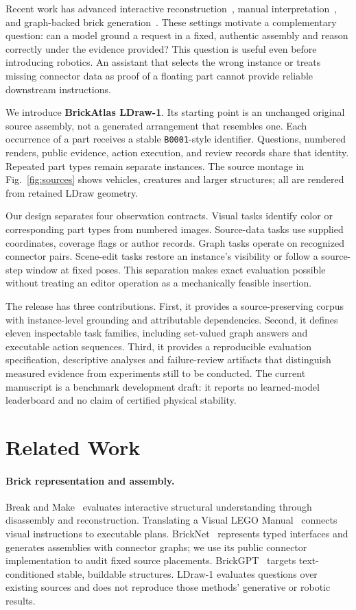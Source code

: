 \documentclass[10pt,twocolumn,letterpaper]{article}
\begin{document}
Recent work has advanced interactive reconstruction~\cite{walsman2022break},
manual interpretation~\cite{wang2022manual}, and graph-backed brick
generation~\cite{kulits2026bricknet}. These settings motivate a
complementary question: can a model ground a request in a fixed,
authentic assembly and reason correctly under the evidence provided?
This question is useful even before introducing robotics. An assistant
that selects the wrong instance or treats missing connector data as proof
of a floating part cannot provide reliable downstream instructions.

We introduce \textbf{BrickAtlas LDraw-1}. Its starting point is an
unchanged original source assembly, not a generated arrangement that
resembles one. Each occurrence of a part receives a stable
\texttt{B0001}-style identifier. Questions, numbered renders, public
evidence, action execution, and review records share that identity.
Repeated part types remain separate instances. The source montage in
Fig.~\ref{fig:sources} shows vehicles, creatures and larger structures;
all are rendered from retained LDraw geometry.

Our design separates four observation contracts. Visual tasks identify
color or corresponding part types from numbered images. Source-data
tasks use supplied coordinates, coverage flags or author records.
Graph tasks operate on recognized connector pairs. Scene-edit tasks
restore an instance's visibility or follow a source-step window at fixed
poses. This separation makes exact evaluation possible without treating
an editor operation as a mechanically feasible insertion.

The release has three contributions. First, it provides a
source-preserving corpus with instance-level grounding and attributable
dependencies. Second, it defines eleven inspectable task families,
including set-valued graph answers and executable action sequences.
Third, it provides a reproducible evaluation specification, descriptive
analyses and failure-review artifacts that distinguish measured evidence
from experiments still to be conducted. The current manuscript is a
benchmark development draft: it reports no learned-model leaderboard
and no claim of certified physical stability.

\section{Related Work}
\paragraph{Brick representation and assembly.}
Break and Make~\cite{walsman2022break} evaluates interactive structural
understanding through disassembly and reconstruction. Translating a
Visual LEGO Manual~\cite{wang2022manual} connects visual instructions to
executable plans. BrickNet~\cite{kulits2026bricknet} represents typed
interfaces and generates assemblies with connector graphs; we use its
public connector implementation to audit fixed source placements.
BrickGPT~\cite{pun2025brickgpt} targets text-conditioned stable, buildable
structures. LDraw-1 evaluates questions over existing sources and does
not reproduce those methods' generative or robotic results.
\end{document}
